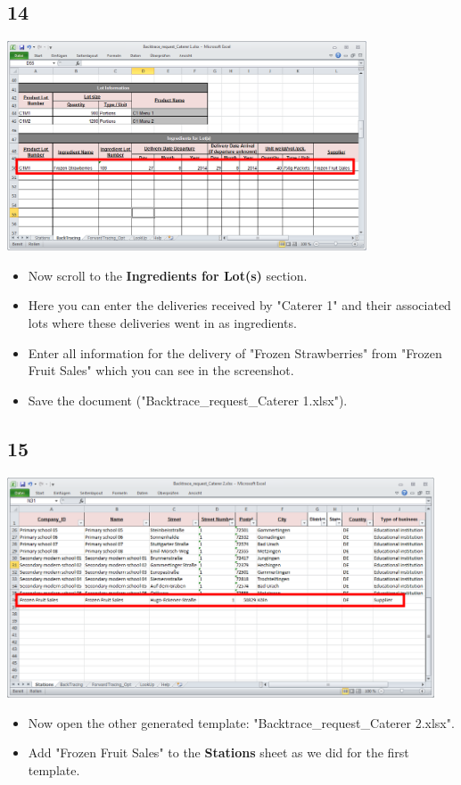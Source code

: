 \documentclass{beamer}
\begin{document}
\subsection{14}
\begin{frame}
	\begin{center}
  		\includegraphics[width=0.8\textwidth]{14.png}
	\end{center}
	\begin{itemize}
		\item Now scroll to the \textbf{Ingredients for Lot(s)} section.
		\item Here you can enter the deliveries received by "Caterer 1" and their associated lots where these deliveries went in as ingredients.
		\item Enter all information for the delivery of "Frozen Strawberries" from "Frozen Fruit Sales" which you can see in the screenshot.
		\item Save the document ("Backtrace\_request\_Caterer 1.xlsx").
	\end{itemize}
\end{frame}

\subsection{15}
\begin{frame}
	\begin{center}
  		\includegraphics[width=0.95\textwidth]{15.png}
	\end{center}
	\begin{itemize}
		\item Now open the other generated template: "Backtrace\_request\_Caterer 2.xlsx".
		\item Add "Frozen Fruit Sales" to the \textbf{Stations} sheet as we did for the first template.
	\end{itemize}
\end{frame}
\end{document}
